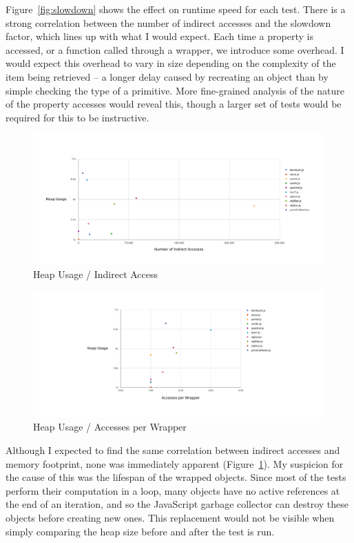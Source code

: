 \documentclass[12pt,a4paper,twoside,openright]{report}
\theoremstyle{definition}
\theoremstyle{dotless}
\begin{document}
Figure~\ref{fig:slowdown} shows the effect on runtime speed for each test. 
There is a strong correlation between the number of indirect accesses
and the slowdown factor, which lines up with what I would expect. Each time a
property is accessed, or a function called through a wrapper, we 
introduce some overhead. I would expect this overhead to vary in size depending 
on the complexity of the item being retrieved -- a longer delay caused 
by recreating an object than by simple checking the type of a primitive. More fine-grained
analysis of the nature of the property accesses would reveal this, though a larger
set of tests would be required for this to be instructive.

\begin{figure}
  \parbox[c]{150mm}{\includegraphics[width=150mm]{../res/mem1.pdf}}
  \caption{Heap Usage / Indirect Access}
  \label{fig:mem1}
\end{figure}
\begin{figure}
  \parbox[c]{150mm}{\includegraphics[width=150mm]{../res/mem2.pdf}}
  \caption{Heap Usage / Accesses per Wrapper}
  \label{fig:mem2}
\end{figure}
Although I expected to find the same correlation between indirect accesses and
memory footprint, none was immediately apparent (Figure~\ref{fig:mem1}). My
suspicion for the cause of this was the lifespan of the wrapped objects. Since
most of the tests perform their computation in a loop, many objects have no active references
at the end of an iteration, and so the JavaScript garbage
collector can destroy these objects before creating new ones. This replacement
would not be visible when simply comparing the heap size before and after the test
is run. 
\end{document}
